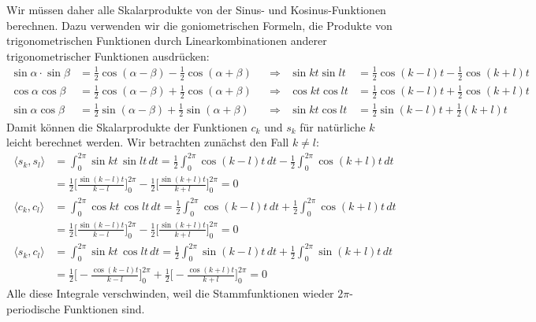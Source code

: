 Wir müssen daher alle Skalarprodukte von der Sinus- und
Kosinus-Funktionen berechnen.
Dazu verwenden wir die goniometrischen Formeln, die Produkte von
trigonometrischen Funktionen durch Linearkombinationen anderer
trigonometrischer Funktionen ausdrücken:
\begin{align*}
\sin\alpha\cdot \sin\beta
&=
\frac12 \cos(\alpha-\beta) - \frac12\cos(\alpha+\beta)
&&\Rightarrow&
\sin kt \sin lt
&=
\frac12 \cos(k-l)t - \frac12\cos(k+l)t
\\
\cos\alpha \cos\beta
&=
\frac12\cos(\alpha-\beta) +\frac12\cos(\alpha+\beta)
&&\Rightarrow&
\cos kt \cos lt
&=
\frac12\cos(k-l)t + \frac12\cos(k+l)t
\\
\sin\alpha\cos\beta
&=
\frac12\sin(\alpha-\beta) + \frac12\sin(\alpha+\beta)
&&\Rightarrow&
\sin kt\cos lt
&=
\frac12\sin(k-l)t + \frac12(k+l)t
\end{align*}
Damit können die Skalarprodukte der Funktionen $c_k$ und $s_k$ für natürliche
$k$ leicht berechnet werden.
Wir betrachten zunächst den Fall $k\ne l$:
\begin{align*}
\langle s_k, s_l\rangle
&=
\int_0^{2\pi} \sin kt\, \sin lt \,dt
=
\frac12\int_0^{2\pi} \cos(k-l)t\,dt
-
\frac12\int_0^{2\pi} \cos(k+l)t\,dt
\\
&=
\frac12\biggl[ \frac{\sin(k-l)t}{k-l} \biggr]_0^{2\pi}
-
\frac12\biggl[ \frac{\sin(k+l)t}{k+l} \biggr]_0^{2\pi}
=
0
\\
\langle c_k, c_l\rangle
&=
\int_0^{2\pi} \cos kt\, \cos lt \,dt
=
\frac12\int_0^{2\pi}\cos(k-l)t\,dt
+
\frac12\int_0^{2\pi}\cos(k+l)t\,dt
\\
&=
\frac12\biggl[ \frac{\sin (k-l)t}{k-l}\biggr]_0^{2\pi}
-
\frac12\biggl[ \frac{\sin (k+l)t}{k+l}\biggr]_0^{2\pi}
=
0
\\
\langle s_k, c_l\rangle
&=
\int_0^{2\pi} \sin kt\, \cos lt \,dt
=
\frac12\int_0^{2\pi} \sin(k-l)t\,dt
+
\frac12\int_0^{2\pi} \sin(k+l)t\,dt
\\
&=
\frac12\biggl[-\frac{\cos(k-l)t}{k-l}\biggr]_0^{2\pi}
+
\frac12\biggl[-\frac{\cos(k+l)t}{k+l}\biggr]_0^{2\pi}
=
0
\end{align*}
Alle diese Integrale verschwinden, weil die Stammfunktionen wieder
$2\pi$-periodische Funktionen sind.

